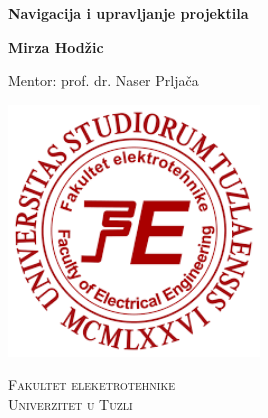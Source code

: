 \begin{titlepage}
    \begin{center}
        \vspace*{1cm}
        
        \Huge
        \textbf{Navigacija i upravljanje projektila}
        
        
        
        \vspace{1.5cm}
        
        \Large
        \textbf{Mirza Hodžic}\\
        
        \vspace{0.5cm}
        
        Mentor: prof. dr. Naser Prljača\\
        
        \vfill
        
        \includegraphics[width=0.5\textwidth]{Images/preuzmi.png}
        
        \vspace{0.8cm}
        
        
        \vspace{0.5cm}
        
        \LARGE
	    \textsc{Fakultet eleketrotehnike\\
	    Univerzitet u Tuzli}
	    
	    \begin{flushright}
	
	    \Large
	
	    \end{flushright}
        
    \end{center}
\end{titlepage}